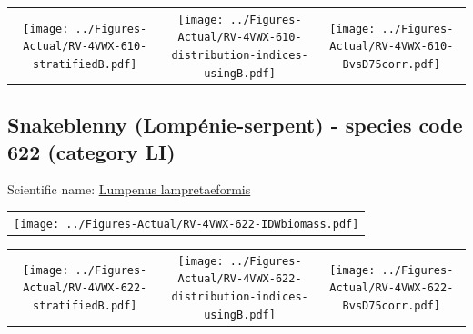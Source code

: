 \documentclass[12pt]{article}\usepackage[]{graphicx}\usepackage[]{color}
\begin{document}
\vspace{1cm}
\begin{minipage}{1.0\textwidth}
 \begin{tabular}{ccc}
\texttt{[image: ../Figures-Actual/RV-4VWX-610-stratifiedB.pdf]} & 
\texttt{[image: ../Figures-Actual/RV-4VWX-610-distribution-indices-usingB.pdf]} & 
\texttt{[image: ../Figures-Actual/RV-4VWX-610-BvsD75corr.pdf]} \\ 
\end{tabular} 
\end{minipage}
\clearpage

\renewcommand\thefigure{\thesubsection\Alph{figure}}

\setcounter{figure}{0}

\hypertarget{sec:622}{%
\subsection{Snakeblenny (Lompénie-serpent) - species code 622 (category LI)}\label{sec:622}}

  


Scientific name: \href{http://www.marinespecies.org/aphia.php?p=taxdetails\&id=154675}{Lumpenus lampretaeformis} \newline
\begin{minipage}{1.0\textwidth}
 \begin{tabular}{c}
\texttt{[image: ../Figures-Actual/RV-4VWX-622-IDWbiomass.pdf]} \\ 
\end{tabular} 
\end{minipage}
\newline

\vspace{1cm}
\begin{minipage}{1.0\textwidth}
 \begin{tabular}{ccc}
\texttt{[image: ../Figures-Actual/RV-4VWX-622-stratifiedB.pdf]} & 
\texttt{[image: ../Figures-Actual/RV-4VWX-622-distribution-indices-usingB.pdf]} & 
\texttt{[image: ../Figures-Actual/RV-4VWX-622-BvsD75corr.pdf]} \\ 
\end{tabular} 
\end{minipage}
\clearpage
\end{document}
